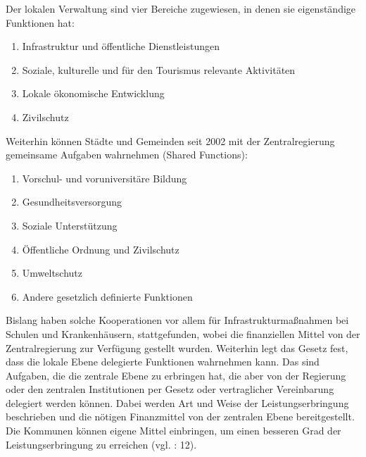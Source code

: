 Der lokalen Verwaltung sind vier Bereiche zugewiesen, in denen sie eigenständige Funktionen hat: 
\begin{enumerate}[label={\arabic*}.] \itemsep1pt \parskip0pt 
\item Infrastruktur und öffentliche Dienstleistungen
\item Soziale, kulturelle und für den Tourismus relevante Aktivitäten
\item Lokale ökonomische Entwicklung
\item Zivilschutz
\end{enumerate}
Weiterhin können Städte und Gemeinden seit 2002 mit der Zentralregierung gemeinsame Aufgaben wahrnehmen (Shared Functions): 

\begin{enumerate}[label={\arabic*}.] \itemsep1pt \parskip0pt 
\item Vorschul- und voruniversitäre Bildung
\item Gesundheitsversorgung 
\item Soziale Unterstützung
\item Öffentliche Ordnung und Zivilschutz
\item Umweltschutz
\item Andere gesetzlich definierte Funktionen
\end{enumerate}
Bislang haben solche Kooperationen vor allem für Infrastrukturmaßnahmen bei Schulen und Krankenhäusern, stattgefunden, wobei die finanziellen Mittel von der Zentralregierung zur Verfügung gestellt wurden. Weiterhin legt das Gesetz fest, dass die lokale Ebene delegierte Funktionen wahrnehmen kann. Das sind Aufgaben, die die zentrale Ebene zu erbringen hat, die aber von der Regierung oder den zentralen Institutionen per Gesetz oder vertraglicher Vereinbarung delegiert werden können. Dabei werden Art und Weise der Leistungserbringung beschrieben und die nötigen Finanzmittel von der zentralen Ebene bereitgestellt. Die Kommunen können eigene Mittel einbringen, um einen besseren Grad der Leistungserbringung zu erreichen (vgl. \cite{did}: 12).\par
